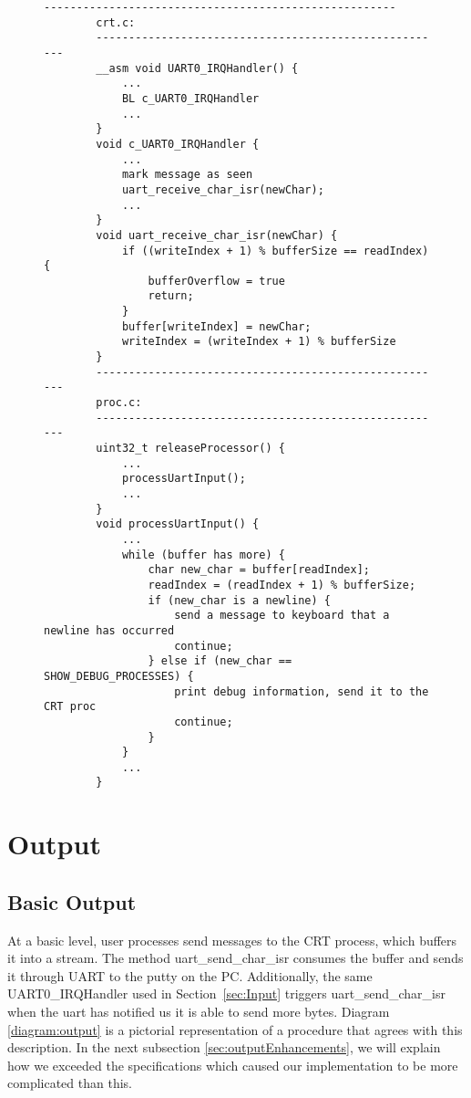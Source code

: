 \documentclass[12pt]{report}
\begin{document}
    \begin{figure}
        \centering
        \begin{lstlisting}[label=code:uart_input,caption={Input Pseudocode}]
        ------------------------------------------------------
        crt.c:
        ------------------------------------------------------
        __asm void UART0_IRQHandler() {
            ...
            BL c_UART0_IRQHandler
            ...
        }
        void c_UART0_IRQHandler {
            ...
            mark message as seen
            uart_receive_char_isr(newChar);
            ...
        }
        void uart_receive_char_isr(newChar) {
            if ((writeIndex + 1) % bufferSize == readIndex) {
                bufferOverflow = true
                return;
            }
            buffer[writeIndex] = newChar;
            writeIndex = (writeIndex + 1) % bufferSize
        }
        ------------------------------------------------------
        proc.c:
        ------------------------------------------------------
        uint32_t releaseProcessor() {
            ...
            processUartInput();
            ...
        }
        void processUartInput() {
            ...
            while (buffer has more) {
                char new_char = buffer[readIndex];
                readIndex = (readIndex + 1) % bufferSize;
                if (new_char is a newline) {
                    send a message to keyboard that a newline has occurred
                    continue;
                } else if (new_char == SHOW_DEBUG_PROCESSES) {
                    print debug information, send it to the CRT proc
                    continue;
                }
            }
            ...
        }
        \end{lstlisting}
    \end{figure}
\section{Output}
\subsection{Basic Output}
    At a basic level, user processes send messages to the CRT process, which
    buffers it into a stream. The method uart\_send\_char\_isr consumes the
    buffer and sends it through UART to the putty on the PC. Additionally, the
    same UART0\_IRQHandler used in Section~\ref{sec:Input} triggers uart\_send\_char\_isr
    when the uart has notified us it is able to send more bytes. Diagram \ref{diagram:output} is a pictorial representation of a
    procedure that agrees with this description. In the next subsection
    \ref{sec:outputEnhancements}, we will explain how we exceeded the
    specifications which caused our implementation to be more complicated than
    this.
\end{document}

